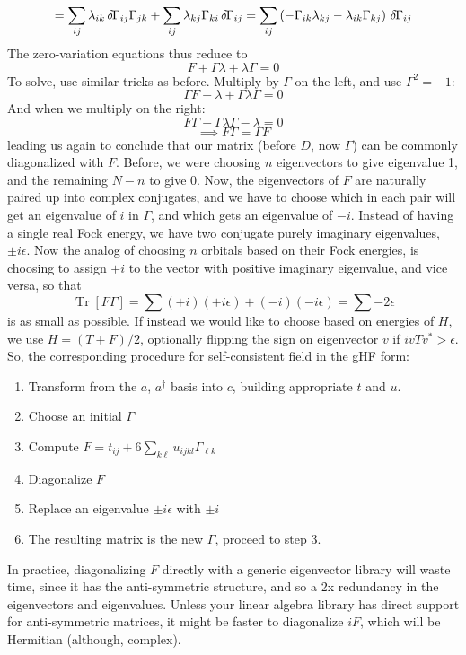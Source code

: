 \documentclass[a4paper,11pt]{article}
\DeclareMathOperator{\Tr}{Tr}
\newcommand{\9}{\,\,\,\,\,\,\,\,\,}
\newcommand{\ichg}{\,\delta\hspace{-0.3mm}}
\begin{document}
$$ = \sum_{ij}\lambda_{ik} \ichg\Gamma_{ij}\Gamma_{jk} + \sum_{ij}\lambda_{kj} \Gamma_{ki}\ichg\Gamma_{ij} = \sum_{ij}\left( -\Gamma_{ik}\lambda_{kj} - \lambda_{ik} \Gamma_{kj}\right)\ichg\Gamma_{ij}$$
The zero-variation equations thus reduce to
$$F + \Gamma \lambda + \lambda \Gamma = 0$$
To solve, use similar tricks as before. Multiply by $\Gamma$ on the left, and use $\Gamma^2 = -1$:
$$\Gamma F -\lambda + \Gamma \lambda \Gamma = 0$$
And when we multiply on the right:
$$F\Gamma  + \Gamma \lambda \Gamma - \lambda = 0$$
$$\implies F\Gamma = \Gamma F$$
leading us again to conclude that our matrix (before $D$, now $\Gamma$) can be commonly diagonalized with $F$. Before, we were choosing $n$ eigenvectors to give eigenvalue 1, and the remaining $N-n$ to give 0. Now, the eigenvectors of $F$ are naturally paired up into complex conjugates, and we have to choose which in each pair will get an eigenvalue of $i$ in $\Gamma$, and which gets an eigenvalue of $-i$. Instead of having a single real Fock energy, we have two conjugate purely imaginary eigenvalues, $\pm i\epsilon$. Now the analog of choosing $n$ orbitals based on their Fock energies, is choosing to assign $+i$ to the vector with positive imaginary eigenvalue, and vice versa, so that
$$\Tr[F\Gamma] = \sum (+i)(+i\epsilon) + (-i)(-i\epsilon) = \sum -2\epsilon$$
is as small as possible. If instead we would like to choose based on energies of $H$, we use $H = (T+F)/2$, optionally flipping the sign on eigenvector $v$ if $ivTv^* > \epsilon$. So, the corresponding procedure for self-consistent field in the gHF form:
\begin{enumerate}
	\item Transform from the $a$, $a^\dagger$ basis into $c$, building appropriate $t$ and $u$.
	\item Choose an initial $\Gamma$
	\item Compute $F = t_{ij} + 6\sum_{k\ell}u_{ijkl}\Gamma_{\ell k}$
	\item Diagonalize $F$
	\item Replace an eigenvalue $\pm i \epsilon$ with $\pm i$
	\item The resulting matrix is the new $\Gamma$, proceed to step 3.
\end{enumerate}
In practice, diagonalizing $F$ directly with a generic eigenvector library will waste time, since it has the anti-symmetric structure, and so a 2x redundancy in the eigenvectors and eigenvalues. Unless your linear algebra library has direct support for anti-symmetric matrices, it might be faster to diagonalize $iF$, which will be Hermitian (although, complex).
\end{document}
